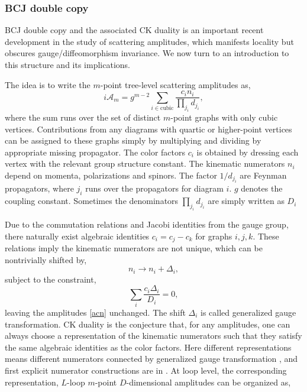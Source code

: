 \documentclass[a4paper,11pt]{article}
\begin{document}
\subsubsection{BCJ double copy}
BCJ double copy and the associated CK duality is an important recent development in the study of scattering amplitudes, which manifests locality but obscures gauge/diffeomorphism invariance.
We now turn to an introduction to this structure and its implications.\par
The idea is to write the $m$-point tree-level scattering amplitudes as,
\begin{equation}\label{acn}
    i \mathcal{A}_m=g^{m-2}\sum_{i\in \text{cubic}}\frac{c_i n_i}{\prod_{j_i}d_{j_i}},
\end{equation}
where the sum runs over the set of distinct $m$-point graphs with only cubic vertices. Contributions from any diagrams with quartic or higher-point vertices can be assigned to these graphs simply by multiplying and dividing by appropriate missing propagator.
The color factors $c_i$ is obtained by dressing each vertex with the relevant group structure constant. The kinematic numerators $n_i$ depend on  momenta, polarizations and spinors. The factor $1/d_{j_i}$ are Feynman propagators, 
where $j_i$ runs over the propagators for diagram $i$. $g$ denotes the coupling constant. Sometimes the denominators $\prod_{j_i}d_{j_i}$ are simply written as $D_i$  \par
Due to the commutation relations and Jacobi identities from the gauge  group, there naturally exist algebraic identities $c_i=c_j-c_k$ for graphs $i,j,k$. These relations imply the kinematic numerators are not unique, which can be nontrivially shifted by,
\begin{equation}\label{gt}
    n_i\to n_i+\Delta_i,
\end{equation}
subject to the constraint,
\begin{equation}\label{gtc}
    \sum_i\frac{c_i \Delta_i}{D_i}=0,
\end{equation}
leaving the amplitudes \eqref{acn} unchanged. The shift $\Delta_i$ is called generalized gauge transformation. 
CK duality is the conjecture that, for any amplitudes, one can always choose a representation of the kinematic numerators such that they satisfy the same algebraic identities as the color factors. 
Here different representations means different numerators connected by generalized gauge transformation \cite{Bern:2008qj}, and first explicit numerator constructions are in \cite{Mafra:2011kj}.
At loop level, the corresponding representation, $L$-loop $m$-point $D$-dimensional amplitudes can be organized as,   
\end{document}
